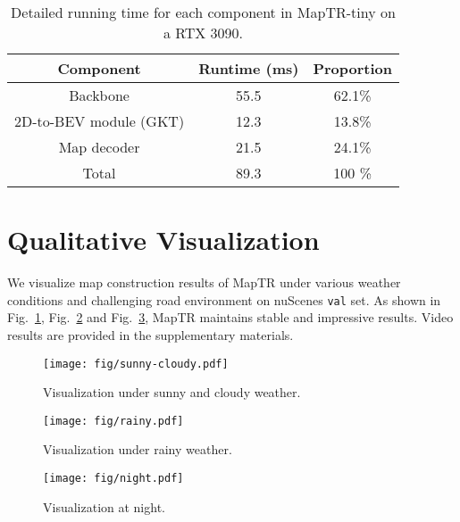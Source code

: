 \documentclass{article} \usepackage{iclr2023_conference,times}
\begin{document}
\begin{table}[ht!]
\begin{center}
\begin{tabular}{ccc}
\hline
\rowcolor{Gray}
Component & Runtime (ms) & Proportion \\
\toprule
Backbone & 55.5 & 62.1\%\\
2D-to-BEV module (GKT) & 12.3 & 13.8\%\\
Map decoder & 21.5 & 24.1\% \\
\hline
Total& 89.3 & 100 \%\\
\bottomrule
\end{tabular}
\end{center}
\vspace*{-0.45cm}
\caption{Detailed running time for each component in MapTR-tiny on a RTX 3090.}
\label{tab:runtime}
\vspace*{-0.35cm}
\end{table}
\section{Qualitative Visualization}
\label{sec:more_vis}
We visualize map construction results of MapTR under various weather conditions and challenging road environment on nuScenes \texttt{val} set. As shown in Fig.~\ref{fig:sunny-cloudy}, Fig.~\ref{fig:rainy} and Fig.~\ref{fig:night}, MapTR maintains stable and impressive results. Video results are provided in the supplementary materials.

\begin{figure}[t!]
    \begin{center}
    \texttt{[image: fig/sunny-cloudy.pdf]}
    \end{center}
    \vspace*{-0.3cm}
    \caption{Visualization under sunny and cloudy weather.}
    \label{fig:sunny-cloudy}
\end{figure}

\begin{figure}[t!]
    \begin{center}
    \texttt{[image: fig/rainy.pdf]}
    \end{center}
    \vspace*{-0.3cm}
    \caption{Visualization under rainy weather.}
    \label{fig:rainy}
\end{figure}

\begin{figure}[t!]
    \begin{center}
    \texttt{[image: fig/night.pdf]}
    \end{center}
    \vspace*{-0.3cm}
    \caption{Visualization at night.}
    \label{fig:night}
\end{figure}
\end{document}
